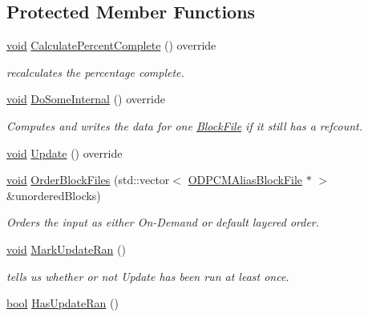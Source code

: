 \subsection*{Protected Member Functions}
\begin{DoxyCompactItemize}
\item 
\hyperlink{sound_8c_ae35f5844602719cf66324f4de2a658b3}{void} \hyperlink{class_o_d_compute_summary_task_ab1723e6af0e37ca604bf4675e1531604}{Calculate\+Percent\+Complete} () override
\begin{DoxyCompactList}\small\item\em recalculates the percentage complete. \end{DoxyCompactList}\item 
\hyperlink{sound_8c_ae35f5844602719cf66324f4de2a658b3}{void} \hyperlink{class_o_d_compute_summary_task_a12f1ea0f398eea35650380cdfb44f038}{Do\+Some\+Internal} () override
\begin{DoxyCompactList}\small\item\em Computes and writes the data for one \hyperlink{class_block_file}{Block\+File} if it still has a refcount. \end{DoxyCompactList}\item 
\hyperlink{sound_8c_ae35f5844602719cf66324f4de2a658b3}{void} \hyperlink{class_o_d_compute_summary_task_aa0401e8172b766391aaebb528349ee24}{Update} () override
\item 
\hyperlink{sound_8c_ae35f5844602719cf66324f4de2a658b3}{void} \hyperlink{class_o_d_compute_summary_task_a0358213532e2df63b020d931dfd5fdc3}{Order\+Block\+Files} (std\+::vector$<$ \hyperlink{class_o_d_p_c_m_alias_block_file}{O\+D\+P\+C\+M\+Alias\+Block\+File} $\ast$ $>$ \&unordered\+Blocks)
\begin{DoxyCompactList}\small\item\em Orders the input as either On-\/\+Demand or default layered order. \end{DoxyCompactList}\item 
\hyperlink{sound_8c_ae35f5844602719cf66324f4de2a658b3}{void} \hyperlink{class_o_d_compute_summary_task_a68e893559694a5d884a19b27d23f13b0}{Mark\+Update\+Ran} ()
\begin{DoxyCompactList}\small\item\em tells us whether or not Update has been run at least once. \end{DoxyCompactList}\item 
\hyperlink{mac_2config_2i386_2lib-src_2libsoxr_2soxr-config_8h_abb452686968e48b67397da5f97445f5b}{bool} \hyperlink{class_o_d_compute_summary_task_a76fde124f8242756ebb2dfc510d42b59}{Has\+Update\+Ran} ()
\end{DoxyCompactItemize}
